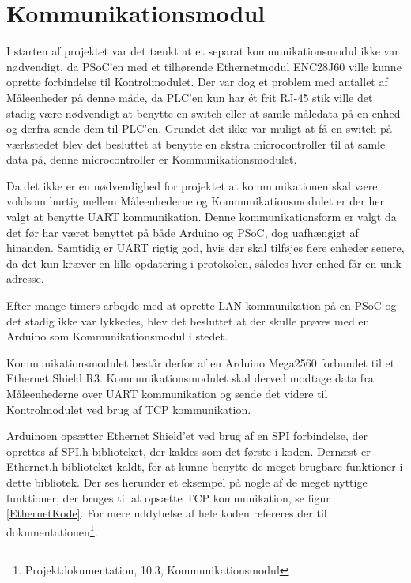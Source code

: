 
\section{Kommunikationsmodul}
\label{Kommunikationsmodul}

I starten af projektet var det tænkt at et separat kommunikationsmodul ikke var nødvendigt, da PSoC'en med et tilhørende Ethernetmodul ENC28J60 ville kunne oprette forbindelse til Kontrolmodulet. Der var dog et problem med antallet af Måleenheder på denne måde, da PLC'en kun har ét frit RJ-45 stik ville det stadig være nødvendigt at benytte en switch eller at samle måledata på en enhed og derfra sende dem til PLC'en. Grundet det ikke var muligt at få en switch på værkstedet blev det besluttet at benytte en ekstra microcontroller til at samle data på, denne microcontroller er Kommunikationsmodulet.   

Da det ikke er en nødvendighed for projektet at kommunikationen skal være voldsom hurtig mellem Måleenhederne og Kommunikationsmodulet er der her valgt at benytte UART kommunikation. Denne kommunikationsform er valgt da det før har været benyttet på både Arduino og PSoC, dog uafhængigt af hinanden. Samtidig er UART rigtig god, hvis der skal tilføjes flere enheder senere, da det kun kræver en lille opdatering i protokolen, således hver enhed får en unik adresse.  

Efter mange timers arbejde med at oprette LAN-kommunikation på en PSoC og det stadig ikke var lykkedes, blev det besluttet at der skulle prøves med en Arduino som Kommunikationsmodul i stedet. 

Kommunikationsmodulet består derfor af en Arduino Mega2560 forbundet til et Ethernet Shield R3. Kommunikationsmodulet skal derved modtage data fra Måleenhederne over UART kommunikation og sende det videre til Kontrolmodulet ved brug af TCP kommunikation. 

Arduinoen opsætter Ethernet Shield'et ved brug af en SPI forbindelse, der oprettes af SPI.h biblioteket, der kaldes som det første i koden. Dernæst er Ethernet.h biblioteket kaldt, for at kunne benytte de meget brugbare funktioner i dette bibliotek\cite{Ethernet}. Der ses herunder et eksempel på nogle af de meget nyttige funktioner, der bruges til at opsætte TCP kommunikation, se figur \ref{EthernetKode}. For mere uddybelse af hele koden refereres der til dokumentationen\footnote{Projektdokumentation, 10.3, Kommunikationsmodul}.

